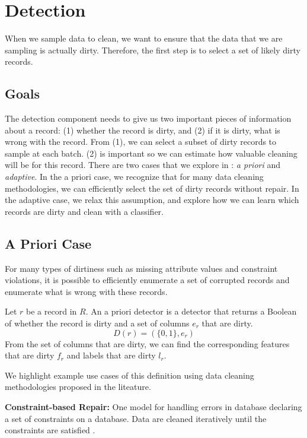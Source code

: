\section{Detection}\label{det}
When we sample data to clean, we want to ensure that the data that we are sampling is actually dirty.
Therefore, the first step is to select a set of likely dirty records.

\subsection{Goals}
The detection component needs to give us two important pieces of information about a record: (1) whether the record is dirty, and (2) if it is dirty, what is wrong with the record.
From (1), we can select a subset of dirty records to sample at each batch. 
(2) is important so we can estimate how valuable cleaning will be for this record.
There are two cases that we explore in \sys: \emph{a priori} and \emph{adaptive}.
In the a priori case, we recognize that for many data cleaning methodologies, we can efficiently select the set of dirty records without repair.
In the adaptive case, we relax this assumption, and explore how we can learn which records are dirty and clean with a classifier.

\subsection{A Priori Case}
For many types of dirtiness such as missing attribute values and constraint violations, it is possible to efficiently enumerate a set of corrupted records and enumerate what is wrong with these records.

\begin{definition}
Let $r$ be a record in $R$. An a priori detector is a detector that returns a Boolean of whether the record is dirty and a set of columns $e_r$ that are dirty.
\[
D(r) = (\{0,1\}, e_r)
\]
From the set of columns that are dirty, we can find the corresponding features that are dirty $f_r$ and labels that are dirty $l_r$.
\end{definition}

\noindent We highlight example use cases of this definition using data cleaning methodologies proposed in the liteature.

\vspace{0.5em}

\noindent\textbf{Constraint-based Repair: }
One model for handling errors in database declaring a set of constraints on a database.
Data are cleaned iteratively until the constraints are satisfied \cite{DBLP:journals/pvldb/YakoutENOI11, DBLP:journals/pvldb/FanLMTY10, khayyat2015bigdansing}.

